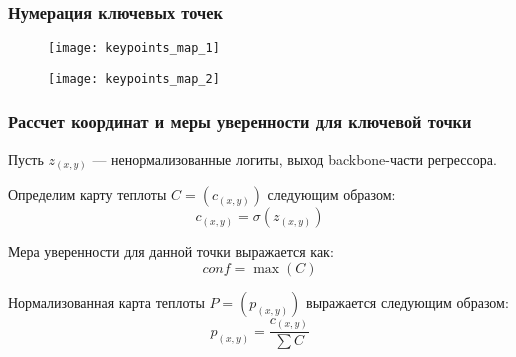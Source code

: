 \begin{frame}
    \frametitle{Нумерация ключевых точек}
    \begin{figure}
        \begin{minipage}[!h]{0.49\linewidth}
            \centering
            \texttt{[image: keypoints\_map\_1]}
        \end{minipage}
        \hfill
        \begin{minipage}[!h]{0.49\linewidth}
            \centering
            \texttt{[image: keypoints\_map\_2]}
        \end{minipage}
    \end{figure}
\end{frame}

\begin{frame}
    \frametitle{Рассчет координат и меры уверенности для ключевой точки}
    Пусть $z_{(x, y)}$ --- ненормализованные логиты, выход backbone-части регрессора.

    Определим карту теплоты $C = (c_{(x, y)})$ следующим образом:
    $$ c_{(x, y)} = \sigma (z_{(x, y)})$$

    Мера уверенности для данной точки выражается как:
    $$ conf = \max(C) $$

    Нормализованная карта теплоты $P = (p_{(x, y)})$ выражается следующим образом:
    $$ p_{(x, y)} =  \frac{c_{(x, y)}}{\sum C}$$

\end{frame}